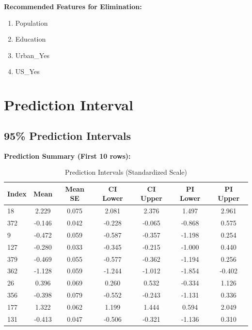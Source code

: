 \documentclass[12pt]{article}
\begin{document}
\textbf{Recommended Features for Elimination:}
\begin{enumerate}
    \item Population
    \item Education
    \item Urban\_Yes
    \item US\_Yes
\end{enumerate}

\section{Prediction Interval}

\subsection{95\% Prediction Intervals}

\textbf{Prediction Summary (First 10 rows):}
\begin{table}[H]
\centering
\caption{Prediction Intervals (Standardized Scale)}
\scriptsize
\begin{tabular}{lcccccc}
\toprule
\textbf{Index} & \textbf{Mean} & \textbf{Mean SE} & \textbf{CI Lower} & \textbf{CI Upper} & \textbf{PI Lower} & \textbf{PI Upper} \\
\midrule
18 & 2.229 & 0.075 & 2.081 & 2.376 & 1.497 & 2.961 \\
372 & -0.146 & 0.042 & -0.228 & -0.065 & -0.868 & 0.575 \\
9 & -0.472 & 0.059 & -0.587 & -0.357 & -1.198 & 0.254 \\
127 & -0.280 & 0.033 & -0.345 & -0.215 & -1.000 & 0.440 \\
379 & -0.469 & 0.055 & -0.577 & -0.362 & -1.194 & 0.256 \\
362 & -1.128 & 0.059 & -1.244 & -1.012 & -1.854 & -0.402 \\
26 & 0.396 & 0.069 & 0.260 & 0.532 & -0.334 & 1.126 \\
356 & -0.398 & 0.079 & -0.552 & -0.243 & -1.131 & 0.336 \\
177 & 1.322 & 0.062 & 1.199 & 1.444 & 0.594 & 2.049 \\
131 & -0.413 & 0.047 & -0.506 & -0.321 & -1.136 & 0.310 \\
\bottomrule
\end{tabular}
\end{table}
\end{document}
